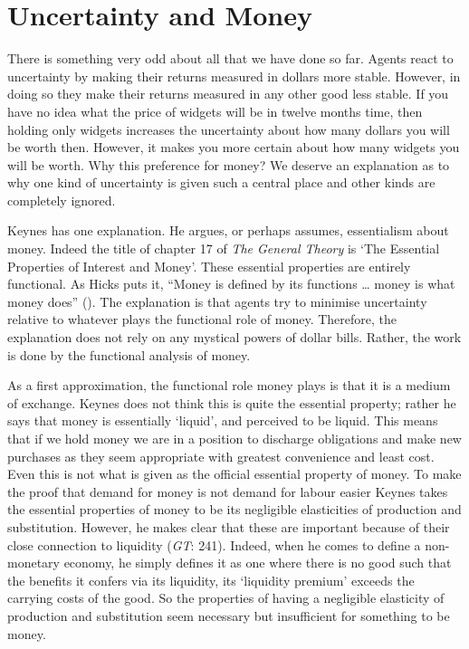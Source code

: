 \documentclass[
  10pt,
  letterpaper,
  DIV=11,
  numbers=noendperiod,
  twoside]{scrartcl}
\begin{document}
\section{Uncertainty and Money}\label{uncertainty-and-money}

There is something very odd about all that we have done so far. Agents
react to uncertainty by making their returns measured in dollars more
stable. However, in doing so they make their returns measured in any
other good less stable. If you have no idea what the price of widgets
will be in twelve months time, then holding only widgets increases the
uncertainty about how many dollars you will be worth then. However, it
makes you more certain about how many widgets you will be worth. Why
this preference for money? We deserve an explanation as to why one kind
of uncertainty is given such a central place and other kinds are
completely ignored.

Keynes has one explanation. He argues, or perhaps assumes, essentialism
about money. Indeed the title of chapter 17 of \emph{The General Theory}
is `The Essential Properties of Interest and Money'. These essential
properties are entirely functional. As Hicks puts it, ``Money is defined
by its functions \ldots{} money is what money does''
(). The explanation is that
agents try to minimise uncertainty relative to whatever plays the
functional role of money. Therefore, the explanation does not rely on
any mystical powers of dollar bills. Rather, the work is done by the
functional analysis of money.

As a first approximation, the functional role money plays is that it is
a medium of exchange. Keynes does not think this is quite the essential
property; rather he says that money is essentially `liquid', and
perceived to be liquid. This means that if we hold money we are in a
position to discharge obligations and make new purchases as they seem
appropriate with greatest convenience and least cost. Even this is not
what is given as the official essential property of money. To make the
proof that demand for money is not demand for labour easier Keynes takes
the essential properties of money to be its negligible elasticities of
production and substitution. However, he makes clear that these are
important because of their close connection to liquidity (\emph{GT}:
241). Indeed, when he comes to define a non-monetary economy, he simply
defines it as one where there is no good such that the benefits it
confers via its liquidity, its `liquidity premium' exceeds the carrying
costs of the good. So the properties of having a negligible elasticity
of production and substitution seem necessary but insufficient for
something to be money.
\end{document}
